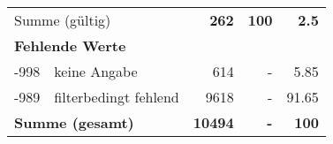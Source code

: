 \begin{longtable}{lXrrr}
     \midrule
     \multicolumn{2}{l}{Summe (gültig)} &
       \textbf{\num{262}} &
     \textbf{100} &
       \textbf{\num[round-mode=places,round-precision=2]{2,5}} \\
     \multicolumn{5}{l}{\textbf{Fehlende Werte}}\\
       -998 &
       keine Angabe &
         \num{614} &
        - &
         \num[round-mode=places,round-precision=2]{5,85} \\
       -989 &
       filterbedingt fehlend &
         \num{9618} &
        - &
         \num[round-mode=places,round-precision=2]{91,65} \\
     \midrule
     \multicolumn{2}{l}{\textbf{Summe (gesamt)}} &
          \textbf{\num{10494}} &
        \textbf{-} &
        \textbf{100} \\
     \bottomrule
     \end{longtable}
     
